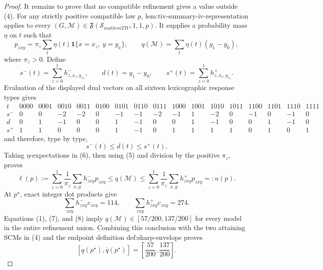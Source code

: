 \documentclass{article}
\begin{document}
\begin{proof}
It remains to prove that no compatible refinement gives a value outside (4).  For any strictly positive compatible law \(p\), \(\text{lem:tiv-summary-iv-representation}\) applies to every \((G,\mathcal M)\in\mathfrak F(\mathcal S_{mathrm{TIV}},1,1,p)\).  It supplies a probability mass \(\eta\) on \(t\) such that
\[
p_{zxy}=\pi_z\sum_t\eta(t)\mathbf 1\{x=x_z,\ y=y_x\},
\qquad
q(\mathcal M)=\sum_t\eta(t)(y_1-y_0),
\tag{5}
\]
where \(\pi_z>0\).  Define
\[
s^-(t)=\sum_{z=0}^1h^-_{z,x_z,y_{x_z}},
\qquad d(t)=y_1-y_0,
\qquad s^+(t)=\sum_{z=0}^1h^+_{z,x_z,y_{x_z}}.
\]
Evaluation of the displayed dual vectors on all sixteen lexicographic response types gives
\[
\begin{array}{c|rrrrrrrrrrrrrrrr}
t&0000&0001&0010&0011&0100&0101&0110&0111&1000&1001&1010&1011&1100&1101&1110&1111\\ \hline
s^-&0&0&-2&-2&0&-1&-1&-2&-1&1&-2&0&-1&0&-1&0\\
d&0&1&-1&0&0&1&-1&0&0&1&-1&0&0&1&-1&0\\
s^+&1&1&0&0&0&1&-1&0&1&1&1&1&0&1&0&1
\end{array}
\]
and therefore, type by type,
\[
s^-(t)\le d(t)\le s^+(t).
\tag{6}
\]
Taking \(\eta\)-expectations in (6), then using (5) and division by the positive \(\pi_z\), proves
\[
\ell(p):=\sum_{z=0}^1\frac{1}{\pi_z}\sum_{x,y}h^-_{zxy}p_{zxy}
\le q(\mathcal M)\le
\sum_{z=0}^1\frac{1}{\pi_z}\sum_{x,y}h^+_{zxy}p_{zxy}=:u(p).
\tag{7}
\]
At \(p^{\star}\), exact integer dot products give
\[
\sum_{zxy}h^-_{zxy}c_{zxy}=114,
\qquad
\sum_{zxy}h^+_{zxy}c_{zxy}=274.
\tag{8}
\]
Equations (1), (7), and (8) imply \(q(\mathcal M)\in[57/200,137/200]\) for every model in the entire refinement union.  Combining this conclusion with the two attaining SCMs in (4) and the endpoint definition \(\text{def:sharp-envelope}\) proves
\[
[\underline q(p^{\star}),\overline q(p^{\star})]
=\left[\frac{57}{200},\frac{137}{200}\right].
\tag{9}
\]


\end{proof}
\end{document}
